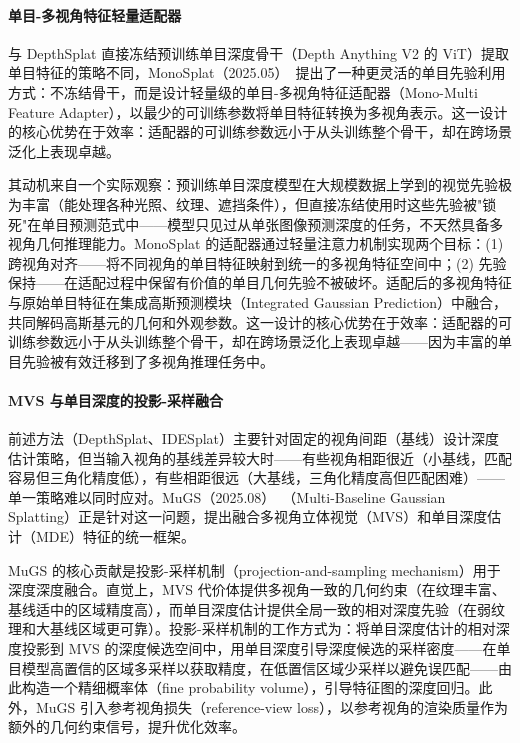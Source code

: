 \paragraph{单目-多视角特征轻量适配器}

与 DepthSplat 直接冻结预训练单目深度骨干（Depth Anything V2 的 ViT）提取单目特征的策略不同，MonoSplat（2025.05）~\cite{2505_15185}提出了一种更灵活的单目先验利用方式：不冻结骨干，而是设计轻量级的单目-多视角特征适配器（Mono-Multi Feature Adapter），以最少的可训练参数将单目特征转换为多视角表示。这一设计的核心优势在于效率：适配器的可训练参数远小于从头训练整个骨干，却在跨场景泛化上表现卓越。

其动机来自一个实际观察：预训练单目深度模型在大规模数据上学到的视觉先验极为丰富（能处理各种光照、纹理、遮挡条件），但直接冻结使用时这些先验被"锁死"在单目预测范式中——模型只见过从单张图像预测深度的任务，不天然具备多视角几何推理能力。MonoSplat 的适配器通过轻量注意力机制实现两个目标：(1) 跨视角对齐——将不同视角的单目特征映射到统一的多视角特征空间中；(2) 先验保持——在适配过程中保留有价值的单目几何先验不被破坏。适配后的多视角特征与原始单目特征在集成高斯预测模块（Integrated Gaussian Prediction）中融合，共同解码高斯基元的几何和外观参数。这一设计的核心优势在于效率：适配器的可训练参数远小于从头训练整个骨干，却在跨场景泛化上表现卓越——因为丰富的单目先验被有效迁移到了多视角推理任务中。

\paragraph{MVS 与单目深度的投影-采样融合}

前述方法（DepthSplat、IDESplat）主要针对固定的视角间距（基线）设计深度估计策略，但当输入视角的基线差异较大时——有些视角相距很近（小基线，匹配容易但三角化精度低），有些相距很远（大基线，三角化精度高但匹配困难）——单一策略难以同时应对。MuGS（2025.08）~\cite{2508_04297}（Multi-Baseline Gaussian Splatting）正是针对这一问题，提出融合多视角立体视觉（MVS）和单目深度估计（MDE）特征的统一框架。

MuGS 的核心贡献是投影-采样机制（projection-and-sampling mechanism）用于深度深度融合。直觉上，MVS 代价体提供多视角一致的几何约束（在纹理丰富、基线适中的区域精度高），而单目深度估计提供全局一致的相对深度先验（在弱纹理和大基线区域更可靠）。投影-采样机制的工作方式为：将单目深度估计的相对深度投影到 MVS 的深度候选空间中，用单目深度引导深度候选的采样密度——在单目模型高置信的区域多采样以获取精度，在低置信区域少采样以避免误匹配——由此构造一个精细概率体（fine probability volume），引导特征图的深度回归。此外，MuGS 引入参考视角损失（reference-view loss），以参考视角的渲染质量作为额外的几何约束信号，提升优化效率。

